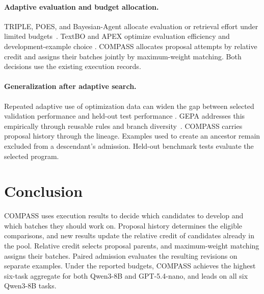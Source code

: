 \paragraph{Adaptive evaluation and budget allocation.}
TRIPLE, POES, and Bayesian-Agent allocate evaluation or retrieval effort under
limited budgets~\citep{triple,poes,bayesianagent}. TextBO and APEX optimize
evaluation efficiency and development-example choice
\citep{kang2026textbo,wang2026apex}.  COMPASS allocates proposal attempts by
relative credit and assigns their batches jointly by maximum-weight matching.
Both decisions use the existing execution records.

\paragraph{Generalization after adaptive search.}
Repeated adaptive use of optimization data can widen the gap between selected
validation performance and held-out test performance
\citep{dwork2015generalization}.  GEPA addresses this empirically through
reusable rules and branch diversity~\citep{gepa}.  COMPASS carries proposal
history through the lineage.  Examples used to create an ancestor remain
excluded from a descendant's admission.  Held-out benchmark tests evaluate
the selected program.

\section{Conclusion}

COMPASS uses execution results to decide which candidates to develop and which
batches they should work on.  Proposal history determines the eligible
comparisons, and new results update the relative credit of candidates already
in the pool.  Relative credit selects proposal parents, and maximum-weight
matching assigns their batches.  Paired admission evaluates the resulting
revisions on separate examples.  Under the reported budgets, COMPASS achieves the highest six-task
aggregate for both Qwen3-8B and GPT-5.4-nano, and leads on all six Qwen3-8B tasks.
